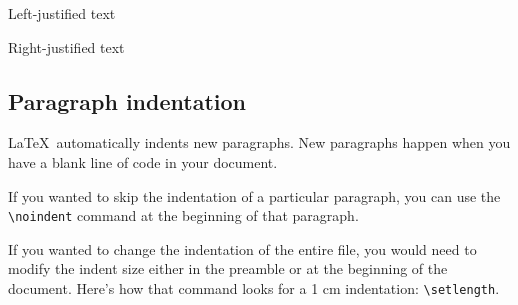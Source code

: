 \documentclass[a4paper]{article}
\newcommand{\sign}[1]{\texttt{\textbackslash{#1}}}
\begin{document}
\begin{minipage}[t]{0.3\linewidth}\vspace{0pt}%
    \begin{center}
        Left-justified text
    \end{center}
    
\end{minipage}
\hspace*{\fill}
\begin{minipage}[t]{0.3\linewidth}\vspace{0pt}%
    \begin{center}
        Right-justified text
    \end{center}
    
\end{minipage}

\subsection{Paragraph indentation}

\LaTeX\ automatically indents new paragraphs. New paragraphs happen when you have a blank
line of code in your document. 

If you wanted to skip the indentation of a particular paragraph,
you can use the \sign{noindent} command at the beginning of that paragraph. 

\noindent If you wanted to change the indentation of the entire file, you would need to modify the indent size either in the preamble or at the beginning of the document. Here’s how that command looks for a 1 cm indentation:
\sign{setlength\string{1cm\string}}.
\end{document}

